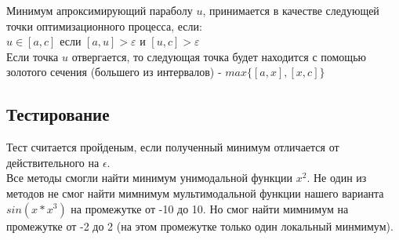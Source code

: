 \documentclass[fleqn]{article}
\begin{document}
Минимум апроксимирующий параболу $u$, принимается в качестве следующей точки оптимизационного процесса, если:\\

$u\in[a,c]$ если $[a,u]>\varepsilon$ и $[u,c]>\varepsilon$\\

Если точка $u$ отвергается, то следующая точка будет находится с помощью золотого сечения (большего из интервалов) - $max\{[a,x],[x,c]\}$\\

\subsection{Тестирование}
Тест считается пройденым, если полученный минимум отличается
от действительного на $\epsilon$.\\
Все методы смогли найти минимум унимодальной функции $x^2$.
Не один из методов не смог найти мимнимум мультимодальной функции
нашего варианта $sin(x*x^3)$ на промежутке от -10 до 10. Но
смог найти мимнимум на промежутке от -2 до 2 (на этом промежутке только один
локальный минмимум).
\end{document}
